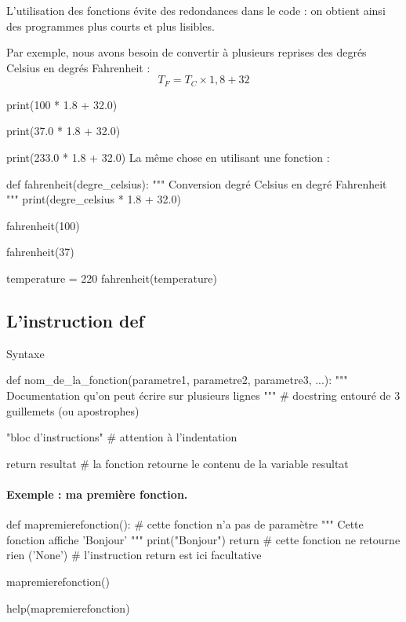 \documentclass[%
oneside,                 %
final,                   %
10pt]{article}
\begin{document}
L'utilisation des fonctions évite des redondances dans le code : on obtient ainsi des programmes plus courts et plus lisibles.

Par exemple, nous avons besoin de convertir à plusieurs reprises des degrés Celsius en degrés Fahrenheit :
$$T_F = T_C \times 1,8 + 32 $$

\bpycod
print(100 * 1.8 + 32.0)
\epycod

\bpycod
print(37.0 * 1.8 + 32.0)
\epycod

\bpycod
print(233.0 * 1.8 + 32.0)
\epycod
La même chose en utilisant une fonction :

\bpycod
def fahrenheit(degre_celsius):
        """
        Conversion degré Celsius en degré Fahrenheit
        """
        print(degre_celsius * 1.8 + 32.0)
\epycod

\bpycod
fahrenheit(100)
\epycod

\bpycod
fahrenheit(37)
\epycod

\bpycod
temperature = 220
fahrenheit(temperature)
\epycod
\subsection{L'instruction def}

\begin{block}{Syntaxe }

\bpycod
def nom_de_la_fonction(parametre1, parametre2, parametre3, ...):
    """
    Documentation
    qu'on peut écrire
    sur plusieurs lignes
    """     # docstring entouré de 3 guillemets (ou apostrophes)

    "bloc d'instructions"     # attention à l'indentation

    return resultat            # la fonction retourne le contenu de la variable resultat
\epycod
\end{block}
\paragraph{Exemple : ma première fonction.}
\bpycod
def mapremierefonction():         # cette fonction n'a pas de paramètre
    """
    Cette fonction affiche 'Bonjour'
    """
    print("Bonjour")
    return                         # cette fonction ne retourne rien ('None')
    # l'instruction return est ici facultative
\epycod

\bpycod
mapremierefonction()
\epycod

\bpycod
help(mapremierefonction)
\epycod


\end{document}
